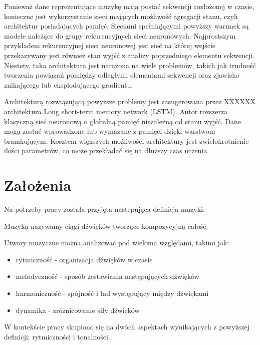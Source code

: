 {{    Ponieważ dane reprezentujące muzykę mają postać sekwencji rozłożonej w czasie, 
    konieczne jest wykorzystanie sieci mających możliwość agregacji stanu, czyli architektur posiadających pamięć.
    Sieciami spełniającymi powyższy warunek są modele należące do grupy rekurencyjnych sieci neuronowych.
    Najprostszym przykładem rekurencyjnej sieci neuronowej jest sieć na której wejście 
    przekazywany jest również stan wyjść z analizy poprzedniego elementu sekwencji.
    Niestety, taka architektura jest narażona na wiele problemów, takich jak trudność
    tworzenia powiązań pomiędzy odległymi elementami sekwencji oraz zjawisko znikającego lub eksplodującego gradientu.

    Architekturą rozwiązującą powyższe problemy jest zasugerowana przez XXXXXX architektura
    Long short-term memory network (LSTM). Autor rozszerza klasyczną sieć neuronową o globalną pamięć niezależną
    od stanu wyjść. Dane mogą zostać wprowadzone lub wymazane z pamięci dzięki warstwom bramkującym. 
    Kosztem większych możliwości architektury jest zwielokrotnienie 
    ilości parametrów, co może przekładać się na dłuższy czas uczenia.
  }

  \section{Założenia}
  {
    Na potrzeby pracy została przyjęta następująca definicja muzyki:

    Muzyką nazywamy ciągi dźwięków tworzące kompozycyjną całość. 

    Utwory muzyczne można analizować pod wieloma względami, takimi jak:
    \begin{itemize}
        \item rytmiczność - organizacja dźwięków w czasie
        \item melodyczność - sposób zestawiania następujących dźwięków 
        \item harmoniczność - spójność i ład występujący między dźwiękami
        \item dynamika - zróżnicowanie siły dźwięków
    \end{itemize}

    W kontekście pracy skupiono się na dwóch aspektach wynikających z powyższej 
    definicji: rytmiczności i tonalności.
  }

}
